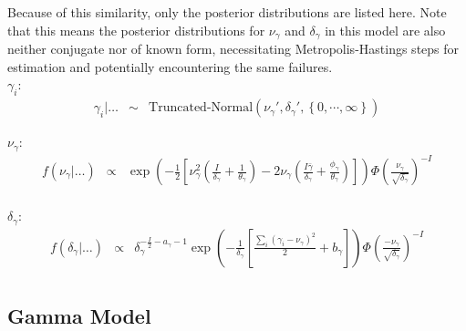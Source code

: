 Because of this similarity, only the posterior distributions are
listed here.  Note that this means the posterior distributions for
$\nu_{\gamma}$ and $\delta_{\gamma}$ in this model are also neither
conjugate nor of known form, necessitating Metropolis-Hastings steps
for estimation and potentially encountering the same failures.\\

$\gamma_i$:\\
\begin{eqnarray*}
\gamma_i|\dots&\sim&\mbox{Truncated-Normal}\left(\nu_{\gamma}',\delta_{\gamma}',\left\{0,\cdots,\infty\right\}\right)
\end{eqnarray*}

$\nu_{\gamma}$:\\
\begin{eqnarray*}
f(\nu_{\gamma}|\dots)&\propto&\exp\left(-\frac{1}{2}\left[\nu_{\gamma}^2\left(\frac{I}{\delta_{\gamma}}+\frac{1}{\theta_{\gamma}}\right)-2\nu_{\gamma}\left(\frac{I\bar{\gamma}}{\delta_{\gamma}}+\frac{\phi_{\gamma}}{\theta_{\gamma}}\right)\right]\right)\Phi\left(\frac{\nu_{\gamma}}{\sqrt{\delta_{\gamma}}}\right)^{-I}\\
\end{eqnarray*}

$\delta_{\gamma}$:\\
\begin{eqnarray*}
f(\delta_{\gamma}|\dots)&\propto&\delta_{\gamma}^{-\frac{I}{2}-a_{\gamma}-1}\exp\left(-\frac{1}{\delta_{\gamma}}\left[\frac{\sum_i(\gamma_i-\nu_{\gamma})^2}{2}+b_{\gamma}\right]\right)\Phi\left(\frac{-\nu_{\gamma}}{\sqrt{\delta_{\gamma}}}\right)^{-I}\\
\end{eqnarray*}

%





\subsection{Gamma Model}
%

